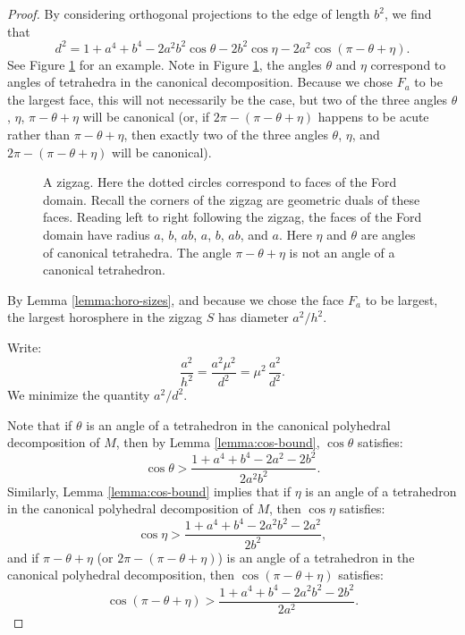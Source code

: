 \documentclass[11pt]{amsart}
\theoremstyle{plain}
\theoremstyle{definition}
\begin{document}
\begin{proof}
By considering orthogonal projections to the edge of length $b^2$, we
find that
\begin{equation}
d^2 = 1+a^4 + b^4 - 2a^2b^2\cos\theta - 2b^2\cos\eta
-2a^2\cos(\pi-\theta+\eta).
\label{eqn:d}
\end{equation}
See Figure \ref{fig:zigzag} for an example.  Note in Figure
\ref{fig:zigzag}, the angles $\theta$ and $\eta$ correspond to angles
of tetrahedra in the canonical decomposition.  Because we chose $F_a$
to be the largest face, this will not necessarily be the case, but two
of the three angles $\theta$, $\eta$, $\pi-\theta+\eta$ will be
canonical (or, if $2\pi-(\pi-\theta+\eta)$ happens to be acute rather
than $\pi-\theta+\eta$, then exactly two of the three angles $\theta$,
$\eta$, and $2\pi-(\pi-\theta+\eta)$ will be canonical).

\begin{figure}[h]
\centerline{}
\caption{A zigzag.  Here the dotted circles correspond to faces of the
	Ford domain.  Recall the corners of the zigzag are geometric duals
	of these faces.  Reading left to right following the zigzag, the
	faces of the Ford domain have radius $a$, $b$, $ab$, $a$, $b$, $ab$,
	and $a$.  Here $\eta$ and $\theta$ are angles of canonical
	tetrahedra.  The angle $\pi-\theta+\eta$ is not an angle of
	a canonical tetrahedron.}
\label{fig:zigzag}
\end{figure}


By Lemma \ref{lemma:horo-sizes}, and because we chose the face $F_a$
to be largest, the largest horosphere in the zigzag $S$ has
diameter $a^2/h^2$.

Write:
$$\frac{a^2}{h^2} = \frac{a^2\mu^2}{d^2} =
	\mu^2 \, \frac{a^2}{d^2}.$$
%
We minimize the quantity $a^2/d^2$.

Note that if $\theta$ is an angle of a tetrahedron in the canonical
polyhedral decomposition of $M$, then by Lemma \ref{lemma:cos-bound},
$\cos\theta$ satisfies:
$$\cos\theta > \frac{1+a^4+b^4 - 2a^2-2b^2}{2a^2b^2}.$$
%
Similarly, Lemma \ref{lemma:cos-bound} implies that if $\eta$ is an
angle of a tetrahedron in the canonical polyhedral decomposition of
$M$, then $\cos\eta$ satisfies:
$$\cos\eta > \frac{1+a^4+b^4 - 2a^2b^2-2a^2}{2b^2},$$
%
and if $\pi-\theta+\eta$ (or $2\pi-(\pi-\theta+\eta)$) is an angle of
a tetrahedron in the canonical polyhedral decomposition, then
$\cos(\pi-\theta+\eta)$ satisfies:
$$\cos(\pi-\theta+\eta) > \frac{1+a^4+b^4 -2a^2b^2-2b^2}{2a^2}.$$


\end{proof}
\end{document}
